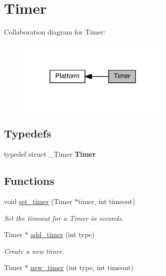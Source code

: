 \hypertarget{group__timer}{}\section{Timer}
\label{group__timer}
Collaboration diagram for Timer\+:\nopagebreak
\begin{figure}[H]
\begin{center}
\leavevmode
\includegraphics[width=210pt]{group__timer}
\end{center}
\end{figure}
\subsection*{Typedefs}
\begin{DoxyCompactItemize}
\item 
\mbox{\label{group__timer_gab154a081bf98a40566e2c962ac9fb810}} 
typedef struct \+\_\+\+Timer {\bfseries Timer}
\end{DoxyCompactItemize}
\subsection*{Functions}
\begin{DoxyCompactItemize}
\item 
void \hyperlink{group__timer_gacbdc140f686e71964beb4e5608313b5b}{set\+\_\+timer} (Timer $\ast$timer, int timeout)
\begin{DoxyCompactList}\small\item\em Set the timeout for a Timer in seconds. \end{DoxyCompactList}\item 
Timer $\ast$ \hyperlink{group__timer_ga0aaa8477c77e036e7f41f7704721b9f7}{add\+\_\+timer} (int type)
\begin{DoxyCompactList}\small\item\em Create a new timer. \end{DoxyCompactList}\item 
Timer $\ast$ \hyperlink{group__timer_gab1f067b2c41862d5cf2a06ca8a5359da}{new\+\_\+timer} (int type, int timeout)
\end{DoxyCompactItemize}


